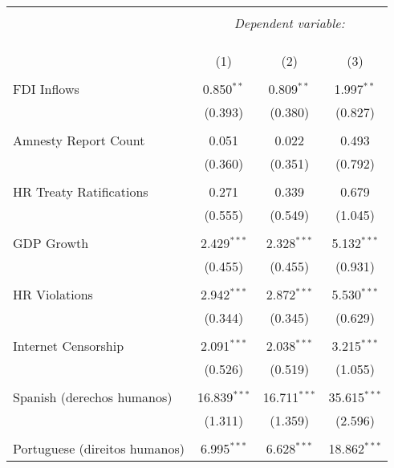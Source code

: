 
\begin{table}[!htbp] \centering 
  \caption{} 
  \label{} 
\begin{tabular}{@{\extracolsep{5pt}}lccc} 
\\[-1.8ex]\hline 
\hline \\[-1.8ex] 
 & \multicolumn{3}{c}{\textit{Dependent variable:}} \\ 
\cline{2-4} 
\\[-1.8ex] & \multicolumn{3}{c}{ } \\ 
\\[-1.8ex] & (1) & (2) & (3)\\ 
\hline \\[-1.8ex] 
 FDI Inflows & 0.850$^{**}$ & 0.809$^{**}$ & 1.997$^{**}$ \\ 
  & (0.393) & (0.380) & (0.827) \\ 
  & & & \\ 
 Amnesty Report Count & 0.051 & 0.022 & 0.493 \\ 
  & (0.360) & (0.351) & (0.792) \\ 
  & & & \\ 
 HR Treaty Ratifications & 0.271 & 0.339 & 0.679 \\ 
  & (0.555) & (0.549) & (1.045) \\ 
  & & & \\ 
 GDP Growth & 2.429$^{***}$ & 2.328$^{***}$ & 5.132$^{***}$ \\ 
  & (0.455) & (0.455) & (0.931) \\ 
  & & & \\ 
 HR Violations & 2.942$^{***}$ & 2.872$^{***}$ & 5.530$^{***}$ \\ 
  & (0.344) & (0.345) & (0.629) \\ 
  & & & \\ 
 Internet Censorship & 2.091$^{***}$ & 2.038$^{***}$ & 3.215$^{***}$ \\ 
  & (0.526) & (0.519) & (1.055) \\ 
  & & & \\ 
 Spanish (derechos humanos) & 16.839$^{***}$ & 16.711$^{***}$ & 35.615$^{***}$ \\ 
  & (1.311) & (1.359) & (2.596) \\ 
  & & & \\ 
 Portuguese (direitos humanos) & 6.995$^{***}$ & 6.628$^{***}$ & 18.862$^{***}$ \\ 

\end{tabular}
\end{table}
